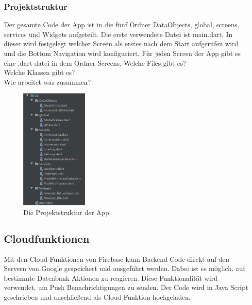 \subsubsection{Projektstruktur}
Der gesamte Code der App ist in die fünf Ordner DataObjects, global, screens, services und Widgets aufgeteilt. 
Die erste verwendete Datei ist main.dart. In dieser wird festgelegt welcher Screen als erstes nach dem Start 
aufgerufen wird und die Bottom Navigation wird konfiguriert. 
Für jeden Screen der App gibt es eine .dart datei in dem Ordner Screens. 
Welche Files gibt es? \\
Welche Klassen gibt es? \\
Wie arbeitet was zusammen? \\
\begin{figure}[H]
  \centering
  \includegraphics[width=0.3\textwidth,angle=0]{abb/projektstruktur}
  \caption{Die Projektstruktur der App}
 \label{fig:projektstruktur_app}
 \end{figure}

\subsection{Cloudfunktionen}
Mit den Cloud Funktionen von Firebase kann Backend-Code direkt auf den Servern von Google gespeichert und ausgeführt werden. 
Dabei ist es möglich, auf bestimmte Datenbank Aktionen zu reagieren. 
Diese Funktionalität wird verwendet, um Push Benachrichtigungen zu senden. 
Der Code wird in Java Script geschrieben und anschließend als Cloud Funktion hochgeladen. 

